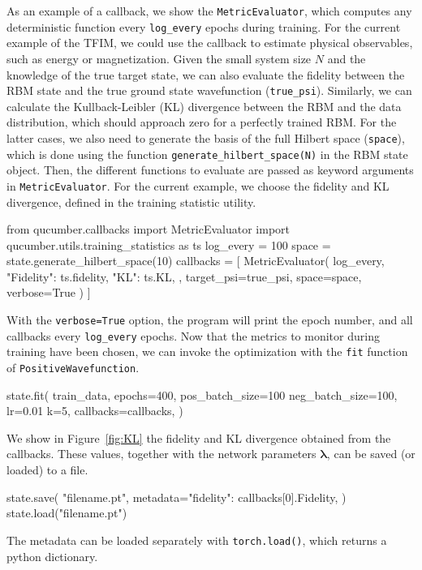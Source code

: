 \documentclass[submission, Phys]{SciPost}
\begin{document}
As an example of a callback, we show the \verb|MetricEvaluator|, which computes any deterministic function every \verb|log_every| epochs during training. For the current example of the TFIM, we could use the callback to estimate physical observables, such as energy or magnetization. Given the small system size $N$ and the knowledge of the true target state, we can also evaluate the fidelity between the RBM state and the true ground state wavefunction (\verb|true_psi|). Similarly, we can calculate the Kullback-Leibler (KL) divergence between the RBM and the data distribution, which should approach zero for a perfectly trained RBM. For the latter cases, we also need to generate the basis of the full Hilbert space (\verb|space|), which is done using the function \verb|generate_hilbert_space(N)| in the RBM state object. Then, the different functions to evaluate are passed as keyword arguments in \verb|MetricEvaluator|. For the current example, we choose the fidelity and KL divergence, defined in the training statistic utility.
\begin{python}
from qucumber.callbacks import MetricEvaluator
import qucumber.utils.training_statistics as ts
log_every = 100
space = state.generate_hilbert_space(10)
callbacks = [
    MetricEvaluator(
        log_every,
        {
        "Fidelity": ts.fidelity, 
        "KL": ts.KL, 
        },
    target_psi=true_psi,
    space=space,
    verbose=True
    )
]
\end{python}
With the \verb|verbose=True| option, the program will print the epoch number, and all callbacks every \verb|log_every| epochs. Now that the metrics to monitor during training have been chosen, we can invoke the optimization with the \verb|fit| function of \verb|PositiveWavefunction|.
\begin{python}
state.fit(
    train_data,
    epochs=400,
    pos_batch_size=100
    neg_batch_size=100,
    lr=0.01
    k=5,
    callbacks=callbacks,
)
\end{python}
We show in Figure~\ref{fig:KL} the fidelity and KL divergence obtained from the  callbacks. These values, together with the network parameters $\bm{\lambda}$, can be  saved (or loaded) to a file.
\begin{python}
state.save(
    "filename.pt",
    metadata={"fidelity": callbacks[0].Fidelity},
)
state.load("filename.pt")
\end{python}
The metadata can be loaded separately with \verb|torch.load()|, which returns a python dictionary.
\end{document}
